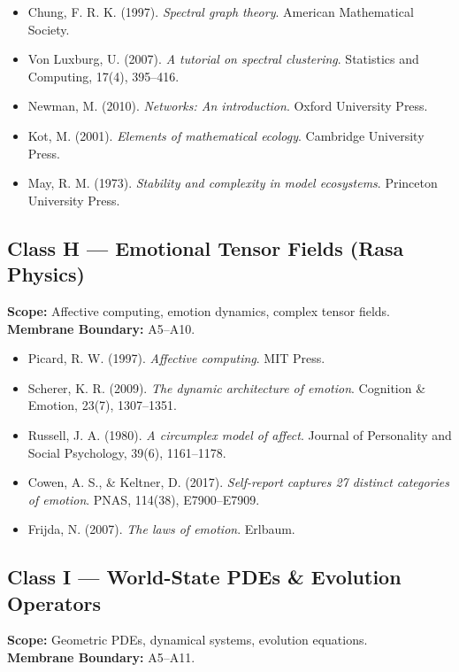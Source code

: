 \begin{itemize}
  \item Chung, F. R. K. (1997). \textit{Spectral graph theory}. American Mathematical Society.
  \item Von Luxburg, U. (2007). \textit{A tutorial on spectral clustering}. Statistics and Computing, 17(4), 395–416.
  \item Newman, M. (2010). \textit{Networks: An introduction}. Oxford University Press.
  \item Kot, M. (2001). \textit{Elements of mathematical ecology}. Cambridge University Press.
  \item May, R. M. (1973). \textit{Stability and complexity in model ecosystems}. Princeton University Press.
\end{itemize}

\subsection*{Class H — Emotional Tensor Fields (Rasa Physics)}
\textbf{Scope:} Affective computing, emotion dynamics, complex tensor fields. \\
\textbf{Membrane Boundary:} A5–A10.

\begin{itemize}
  \item Picard, R. W. (1997). \textit{Affective computing}. MIT Press.
  \item Scherer, K. R. (2009). \textit{The dynamic architecture of emotion}. Cognition \& Emotion, 23(7), 1307–1351.
  \item Russell, J. A. (1980). \textit{A circumplex model of affect}. Journal of Personality and Social Psychology, 39(6), 1161–1178.
  \item Cowen, A. S., \& Keltner, D. (2017). \textit{Self-report captures 27 distinct categories of emotion}. PNAS, 114(38), E7900–E7909.
  \item Frijda, N. (2007). \textit{The laws of emotion}. Erlbaum.
\end{itemize}

\subsection*{Class I — World-State PDEs \& Evolution Operators}
\textbf{Scope:} Geometric PDEs, dynamical systems, evolution equations. \\
\textbf{Membrane Boundary:} A5–A11.

